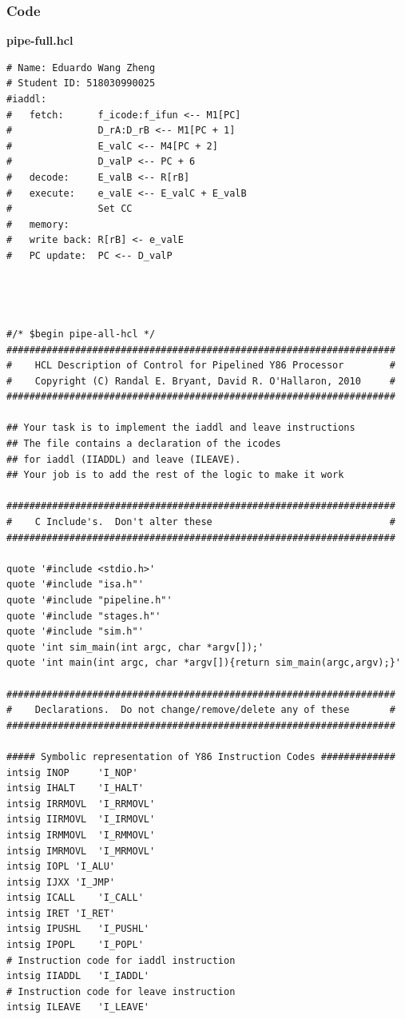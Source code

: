 \documentclass{article}
\begin{document}
\subsubsection{Code}
\textbf{pipe-full.hcl}
\begin{lstlisting}[numberstyle=\scriptsize, basicstyle=\scriptsize]
# Name: Eduardo Wang Zheng
# Student ID: 518030990025
#iaddl:
#   fetch:      f_icode:f_ifun <-- M1[PC]
#               D_rA:D_rB <-- M1[PC + 1]
#               E_valC <-- M4[PC + 2]
#               D_valP <-- PC + 6
#   decode:     E_valB <-- R[rB]
#   execute:    e_valE <-- E_valC + E_valB
#               Set CC
#   memory: 
#   write back: R[rB] <- e_valE
#   PC update:  PC <-- D_valP




#/* $begin pipe-all-hcl */
####################################################################
#    HCL Description of Control for Pipelined Y86 Processor        #
#    Copyright (C) Randal E. Bryant, David R. O'Hallaron, 2010     #
####################################################################

## Your task is to implement the iaddl and leave instructions
## The file contains a declaration of the icodes
## for iaddl (IIADDL) and leave (ILEAVE).
## Your job is to add the rest of the logic to make it work

####################################################################
#    C Include's.  Don't alter these                               #
####################################################################

quote '#include <stdio.h>'
quote '#include "isa.h"'
quote '#include "pipeline.h"'
quote '#include "stages.h"'
quote '#include "sim.h"'
quote 'int sim_main(int argc, char *argv[]);'
quote 'int main(int argc, char *argv[]){return sim_main(argc,argv);}'

####################################################################
#    Declarations.  Do not change/remove/delete any of these       #
####################################################################

##### Symbolic representation of Y86 Instruction Codes #############
intsig INOP 	'I_NOP'
intsig IHALT	'I_HALT'
intsig IRRMOVL	'I_RRMOVL'
intsig IIRMOVL	'I_IRMOVL'
intsig IRMMOVL	'I_RMMOVL'
intsig IMRMOVL	'I_MRMOVL'
intsig IOPL	'I_ALU'
intsig IJXX	'I_JMP'
intsig ICALL	'I_CALL'
intsig IRET	'I_RET'
intsig IPUSHL	'I_PUSHL'
intsig IPOPL	'I_POPL'
# Instruction code for iaddl instruction
intsig IIADDL	'I_IADDL'
# Instruction code for leave instruction
intsig ILEAVE	'I_LEAVE'


\end{lstlisting}
\end{document}
